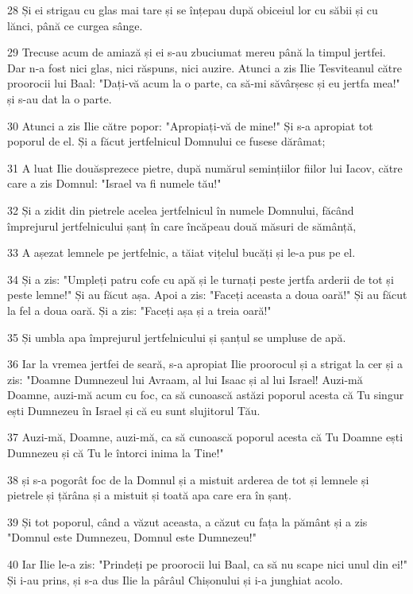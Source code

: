 \par 28 Și ei strigau cu glas mai tare și se înțepau după obiceiul lor cu săbii și cu lănci, până ce curgea sânge.
\par 29 Trecuse acum de amiază și ei s-au zbuciumat mereu până la timpul jertfei. Dar n-a fost nici glas, nici răspuns, nici auzire. Atunci a zis Ilie Tesviteanul către proorocii lui Baal: "Dați-vă acum la o parte, ca să-mi săvârșesc și eu jertfa mea!" și s-au dat la o parte.
\par 30 Atunci a zis Ilie către popor: "Apropiați-vă de mine!" Și s-a apropiat tot poporul de el. Și a făcut jertfelnicul Domnului ce fusese dărâmat;
\par 31 A luat Ilie douăsprezece pietre, după numărul semințiilor fiilor lui Iacov, către care a zis Domnul: "Israel va fi numele tău!"
\par 32 Și a zidit din pietrele acelea jertfelnicul în numele Domnului, făcând împrejurul jertfelnicului șanț în care încăpeau două măsuri de sămânță,
\par 33 A așezat lemnele pe jertfelnic, a tăiat vițelul bucăți și le-a pus pe el.
\par 34 Și a zis: "Umpleți patru cofe cu apă și le turnați peste jertfa arderii de tot și peste lemne!" Și au făcut așa. Apoi a zis: "Faceți aceasta a doua oară!" Și au făcut la fel a doua oară. Și a zis: "Faceți așa și a treia oară!"
\par 35 Și umbla apa împrejurul jertfelnicului și șanțul se umpluse de apă.
\par 36 Iar la vremea jertfei de seară, s-a apropiat Ilie proorocul și a strigat la cer și a zis: "Doamne Dumnezeul lui Avraam, al lui Isaac și al lui Israel! Auzi-mă Doamne, auzi-mă acum cu foc, ca să cunoască astăzi poporul acesta că Tu singur ești Dumnezeu în Israel și că eu sunt slujitorul Tău.
\par 37 Auzi-mă, Doamne, auzi-mă, ca să cunoască poporul acesta că Tu Doamne ești Dumnezeu și că Tu le întorci inima la Tine!"
\par 38 și s-a pogorât foc de la Domnul și a mistuit arderea de tot și lemnele și pietrele și țărâna și a mistuit și toată apa care era în șanț.
\par 39 Și tot poporul, când a văzut aceasta, a căzut cu fața la pământ și a zis  "Domnul este Dumnezeu, Domnul este Dumnezeu!"
\par 40 Iar Ilie le-a zis: "Prindeți pe proorocii lui Baal, ca să nu scape nici unul din ei!" Și i-au prins, și s-a dus Ilie la pârâul Chișonului și i-a junghiat acolo.
